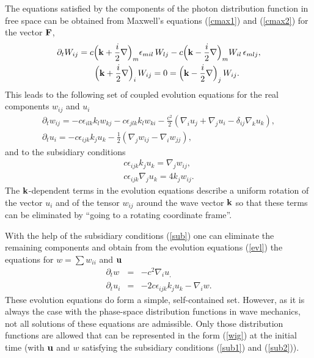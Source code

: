 \documentclass{article}
\begin{document}
The equations satisfied by the components of the photon distribution
function in free space can be obtained from Maxwell's equations
(\ref{cmax1}) and (\ref{cmax2}) for the vector ${\bf F}$,
\begin{eqnarray}
\partial_t W_{ij} = c\Big({\bf k} + \frac{i}{2}{\bf
\nabla}\Big)_m \epsilon_{mil}\,W_{lj} - c\Big({\bf k} -
\frac{i}{2}{\bf \nabla}\Big)_m W_{il}\,\epsilon_{mlj},\\
\Big({\bf k} + \frac{i}{2}{\bf \nabla}\Big)_i\,W_{ij} = 0 = \Big({\bf k} -
\frac{i}{2}{\bf \nabla}\Big)_j\,W_{ij}.\hspace{25pt}
\end{eqnarray}
This leads to the following set of coupled evolution equations for the real
components $w_{ij}$ and $u_i$
\label{evl}
\begin{eqnarray}
 \partial_t w_{ij} = -c\epsilon_{ilk} k_l w_{kj}
 -c\epsilon_{jlk} k_l w_{ki} - \frac{c^2}{2}(\nabla_i u_j + \nabla_j u_i
 -\delta_{ij} \nabla_k u_k),\\
 \partial_t u_i = -c\epsilon_{ijk} k_j u_k - \frac{1}{2}
 (\nabla_j w_{ij} - \nabla_i w_{jj}),\hspace{100pt}
\end{eqnarray}
and to the subsidiary conditions
\label{sub}
\begin{eqnarray}
 c\epsilon_{ijk} k_j u_k = \nabla_j w_{ij},\label{sub1}\\
 c\epsilon_{ijk} \nabla_j u_k = 4k_j w_{ij}.\label{sub2}
\end{eqnarray}
The ${\bf k}$-dependent terms in the evolution equations describe a uniform
rotation of the vector $u_i$ and of the tensor $w_{ij}$ around the wave vector ${\bf k}$ so that these terms can be eliminated by ``going to a rotating coordinate frame''.

With the help of the subsidiary conditions (\ref{sub}) one can eliminate the
remaining components and obtain from the evolution equations (\ref{evl})
the equations for $w=\sum w_{ii}$ and ${\bf u}$
\begin{eqnarray}
\partial_t w &=& -c^2\nabla_i u_,\\
\partial_t u_i &=& -2c\epsilon_{ijk} k_j u_k - \nabla_i w.
\end{eqnarray}
These evolution equations do form a simple, self-contained set. However, as
it is always the case with the phase-space distribution functions in wave
mechanics, not all solutions of these equations are admissible. Only those
distribution functions are allowed that can be represented in the form
(\ref{wig}) at the initial time (with ${\bf u}$ and $w$ satisfying the
subsidiary conditions (\ref{sub1}) and (\ref{sub2})).
\end{document}

